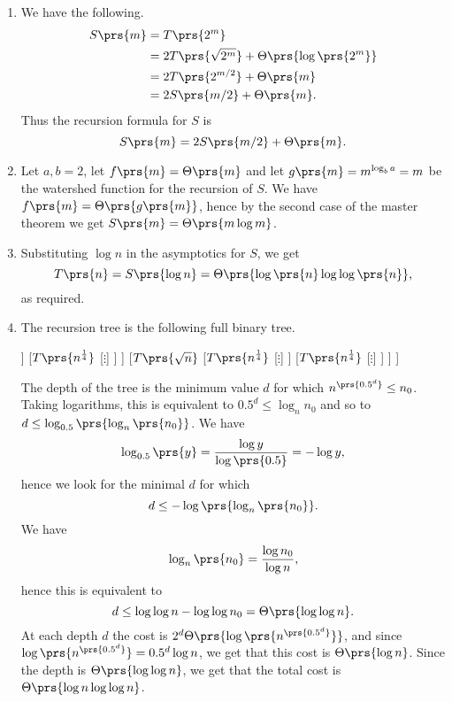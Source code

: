 \documentclass[oneside]{scrbook}
\theoremstyle{definition}
\begin{document}
\begin{problem}
\begin{enumerate}[label=\alph*.]
\item %
We have the following.
\begin{align*}
S\prs{m} &= T\prs{2^m}
\\&= 2T\prs{\sqrt{2^m}} + \Theta\prs{\log\prs{2^m}}
\\&= 2 T \prs{2^{m/2}} + \Theta\prs{m}
\\&= 2 S\prs{m/2} + \Theta\prs{m} \text{.}
\end{align*}
Thus the recursion formula for $S$ is
\[S\prs{m} = 2 S\prs{m/2} + \Theta\prs{m} \text{.}\]
\item %
Let $a,b = 2$, let $f\prs{m} = \Theta\prs{m}$ and let $g\prs{m} = m^{\log_b a} = m$ be the watershed function for the recursion of $S$. We have $f\prs{m} = \Theta\prs{g\prs{m}}$, hence by the second case of the master theorem we get $S\prs{m} = \Theta\prs{m \log m}$.
\item %
Substituting $\log n$ in the asymptotics for $S$, we get
\[T\prs{n} = S\prs{\log n} = \Theta\prs{\log \prs{n} \log \log \prs{n}} \text{,}\]
as required.
\item %
The recursion tree is the following full binary tree.
\begin{center}
\begin{forest}
[$T\prs{n}$
	[$T\prs{\sqrt{n}}$
		[$T\prs{n^{\frac{1}{4}}}$
			[$\vdots$]
		]
		[$T\prs{n^{\frac{1}{4}}}$
			[$\vdots$]
		]
	]
	[$T\prs{\sqrt{n}}$
		[$T\prs{n^{\frac{1}{4}}}$
			[$\vdots$]
		]
		[$T\prs{n^{\frac{1}{4}}}$
			[$\vdots$]
		]
	]
]
\end{forest}
\end{center}
The depth of the tree is the minimum value $d$ for which $n^{\prs{0.5^d}} \leq n_0$. Taking logarithms, this is equivalent to $0.5^d \leq \log_n n_0$ and so to $d \leq \log_{0.5}\prs{\log_n\prs{n_0}}$. We have
\begin{align*}
\log_{0.5}\prs{y} = \frac{\log y}{\log \prs{0.5}} = - \log y \text{,}
\end{align*}
hence we look for the minimal $d$ for which
\[d \leq - \log \prs{ \log_n \prs{n_0}} \text{.}\]
We have
\begin{align*}
\log_n \prs{n_0} = \frac{\log n_0}{\log n} \text{,}
\end{align*}
hence this is equivalent to
\[d \leq \log \log n - \log \log n_0 = \Theta\prs{\log \log n} \text{.}\]
At each depth $d$ the cost is $2^d \Theta\prs{\log \prs{n^{\prs{0.5^d}}}}$, and since $\log\prs{n^{\prs{0.5^d}}} = 0.5^d \log n$, we get that this cost is $\Theta\prs{\log n}$. Since the depth is $\Theta\prs{\log \log n}$, we get that the total cost is $\Theta\prs{\log n \log \log n}$.


\end{enumerate}
\end{problem}
\end{document}
